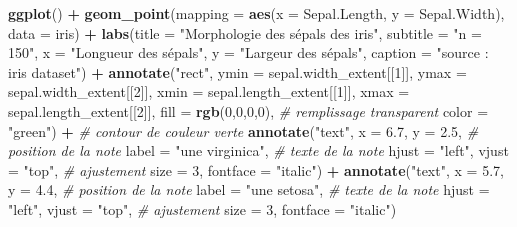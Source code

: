 \documentclass[
  11pt,
  french,
]{book}
\makeatletter
\newenvironment{Shaded}{\begin{snugshade}}{\end{snugshade}}
\newcommand{\CommentTok}[1]{\textcolor[rgb]{0.56,0.35,0.01}{\textit{#1}}}
\newcommand{\DataTypeTok}[1]{\textcolor[rgb]{0.13,0.29,0.53}{#1}}
\newcommand{\DecValTok}[1]{\textcolor[rgb]{0.00,0.00,0.81}{#1}}
\newcommand{\FloatTok}[1]{\textcolor[rgb]{0.00,0.00,0.81}{#1}}
\newcommand{\KeywordTok}[1]{\textcolor[rgb]{0.13,0.29,0.53}{\textbf{#1}}}
\newcommand{\NormalTok}[1]{#1}
\newcommand{\OperatorTok}[1]{\textcolor[rgb]{0.81,0.36,0.00}{\textbf{#1}}}
\newcommand{\StringTok}[1]{\textcolor[rgb]{0.31,0.60,0.02}{#1}}
\newenvironment{kframe}{%
\medskip{}
\setlength{\fboxsep}{.8em}
 \def\at@end@of@kframe{}%
 \ifinner\ifhmode%
  \def\at@end@of@kframe{\end{minipage}}%
  \begin{minipage}{\columnwidth}%
 \fi\fi%
 \def\FrameCommand##1{\hskip\@totalleftmargin \hskip-\fboxsep
 \colorbox{shadecolor}{##1}\hskip-\fboxsep
     \hskip-\linewidth \hskip-\@totalleftmargin \hskip\columnwidth}%
 \MakeFramed {\advance\hsize-\width
   \@totalleftmargin\z@ \linewidth\hsize
   \@setminipage}}%
 {\par\unskip\endMakeFramed%
 \at@end@of@kframe}
\renewenvironment{Shaded}{\begin{kframe}}{\end{kframe}}
\makeatother
\begin{document}
\begin{Shaded}
\begin{Highlighting}[]
\KeywordTok{ggplot}\NormalTok{() }\OperatorTok{+}
\StringTok{  }\KeywordTok{geom_point}\NormalTok{(}\DataTypeTok{mapping =} \KeywordTok{aes}\NormalTok{(}\DataTypeTok{x =}\NormalTok{ Sepal.Length, }\DataTypeTok{y =}\NormalTok{ Sepal.Width), }\DataTypeTok{data =}\NormalTok{ iris) }\OperatorTok{+}
\StringTok{  }\KeywordTok{labs}\NormalTok{(}\DataTypeTok{title =} \StringTok{"Morphologie des sépals des iris"}\NormalTok{, }\DataTypeTok{subtitle =} \StringTok{"n = 150"}\NormalTok{,}
       \DataTypeTok{x =} \StringTok{"Longueur des sépals"}\NormalTok{, }
       \DataTypeTok{y =} \StringTok{"Largeur des sépals"}\NormalTok{,}
       \DataTypeTok{caption =} \StringTok{"source : iris dataset"}\NormalTok{) }\OperatorTok{+}
\StringTok{  }\KeywordTok{annotate}\NormalTok{(}\StringTok{"rect"}\NormalTok{, }
           \DataTypeTok{ymin =}\NormalTok{ sepal.width_extent[[}\DecValTok{1}\NormalTok{]],}
           \DataTypeTok{ymax =}\NormalTok{ sepal.width_extent[[}\DecValTok{2}\NormalTok{]],}
           \DataTypeTok{xmin =}\NormalTok{ sepal.length_extent[[}\DecValTok{1}\NormalTok{]],}
           \DataTypeTok{xmax =}\NormalTok{ sepal.length_extent[[}\DecValTok{2}\NormalTok{]],}
           \DataTypeTok{fill =} \KeywordTok{rgb}\NormalTok{(}\DecValTok{0}\NormalTok{,}\DecValTok{0}\NormalTok{,}\DecValTok{0}\NormalTok{,}\DecValTok{0}\NormalTok{),  }\CommentTok{# remplissage transparent}
           \DataTypeTok{color =} \StringTok{"green"}\NormalTok{) }\OperatorTok{+}\StringTok{ }\CommentTok{# contour de couleur verte}
\StringTok{  }\KeywordTok{annotate}\NormalTok{(}\StringTok{"text"}\NormalTok{, }\DataTypeTok{x =} \FloatTok{6.7}\NormalTok{, }\DataTypeTok{y =} \FloatTok{2.5}\NormalTok{, }\CommentTok{# position de la note}
           \DataTypeTok{label =} \StringTok{"une virginica"}\NormalTok{,  }\CommentTok{# texte de la note}
           \DataTypeTok{hjust =} \StringTok{"left"}\NormalTok{, }\DataTypeTok{vjust =} \StringTok{"top"}\NormalTok{, }\CommentTok{# ajustement}
           \DataTypeTok{size =} \DecValTok{3}\NormalTok{, }\DataTypeTok{fontface =} \StringTok{"italic"}\NormalTok{) }\OperatorTok{+}\StringTok{ }
\StringTok{  }\KeywordTok{annotate}\NormalTok{(}\StringTok{"text"}\NormalTok{, }\DataTypeTok{x =} \FloatTok{5.7}\NormalTok{, }\DataTypeTok{y =} \FloatTok{4.4}\NormalTok{, }\CommentTok{# position de la note}
           \DataTypeTok{label =} \StringTok{"une setosa"}\NormalTok{,  }\CommentTok{# texte de la note}
           \DataTypeTok{hjust =} \StringTok{"left"}\NormalTok{, }\DataTypeTok{vjust =} \StringTok{"top"}\NormalTok{, }\CommentTok{# ajustement}
           \DataTypeTok{size =} \DecValTok{3}\NormalTok{, }\DataTypeTok{fontface =} \StringTok{"italic"}\NormalTok{)}
\end{Highlighting}
\end{Shaded}
\end{document}
